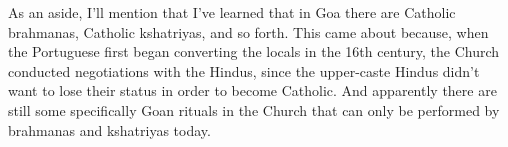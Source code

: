 \begin{footnotesize}
\begin{sffamily}
As an aside, I'll mention that I've learned that in Goa there are Catholic brahmanas, Catholic kshatriyas, and so forth. This came about because, when the Portuguese first began converting the locals in the 16th century, the Church conducted negotiations with the Hindus, since the upper-caste Hindus didn't want to lose their status in order to become Catholic. And apparently there are still some specifically Goan rituals in the Church that can only be performed by brahmanas and kshatriyas today.

\hfill

\end{sffamily}
\end{footnotesize}

